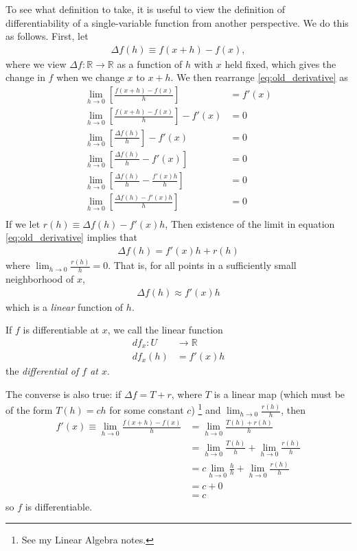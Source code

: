 \documentclass[12pt,letterpaper,reqno]{article}
\numberwithin{equation}{section}
\newcommand{\R}{\ensuremath{\mathbb R}}
\begin{document}
{To see what definition to take, it is useful to view the definition of differentiability of a single-variable function from another perspective. We do this as follows. First, let 
\begin{align*}
	\Delta f(h)\equiv f(x+h)-f(x),
\end{align*}
where we view $\Delta f:\R \to \R$ as a function of $h$ with $x$ held fixed, which gives the change in $f$ when we change $x$ to $x+h$. We then rearrange \eqref{eq:old_derivative} as 
\begin{align*}
	\lim_{h \to 0}\left[\frac{f(x+h)-f(x)}{h}\right]&=f'(x) \\
	\lim_{h \to 0}\left[\frac{f(x+h)-f(x)}{h}\right]-f'(x)&=0 \\
	\lim_{h \to 0}\left[\frac{\Delta f(h)}{h}\right]-f'(x)&=0 \\
	\lim_{h \to 0}\left[\frac{\Delta f(h)}{h}-f'(x)\right]&=0 \\
	\lim_{h \to 0}\left[\frac{\Delta f(h)}{h}-\frac{f'(x)h}{h}\right]&=0 \\
	\lim_{h \to 0}\left[\frac{\Delta f(h)-f'(x)h}{h}\right]&=0 \\
\end{align*} 
If we let $r(h) \equiv \Delta f(h)-f'(x)h$, Then existence of the limit in equation \eqref{eq:old_derivative} implies that 
\begin{align}
	\Delta f(h)=f'(x)h+r(h)
\end{align}
where $\lim_{h \to 0}\frac{r(h)}{h}=0$. That is, for all points in a sufficiently small neighborhood of $x$,
\begin{align}
	\Delta f(h) \approx f'(x)h
\end{align}
which is a \emph{linear} function of $h$. 
\begin{defn}
If $f$ is differentiable at $x$, we call the linear function 
\begin{align*}
	df_x:U &\to \R \\
	df_x(h)&=f'(x)h
\end{align*}	
the \emph{differential of $f$ at $x$}.
\end{defn}
The converse is also true: if $\Delta f=T+r$, where $T$ is a linear map (which must be of the form $T(h)=ch$ for some constant $c$) \footnote{See my Linear Algebra notes.} and $\lim_{h\to 0}\frac{r(h)}{h}$, then
\begin{align*}
	f'(x)\equiv \lim_{h \to 0}\frac{f(x+h)-f(x)}{h}&=\lim_{h \to 0}\frac{T(h)+r(h)}{h}\\
	&=\lim_{h \to 0}\frac{T(h)}{h}+\lim_{h \to 0}\frac{r(h)}{h} \\
	&=c\lim_{h \to 0}\frac{h}{h}+\lim_{h \to 0}\frac{r(h)}{h} \\
	&=c+0 \\
	&=c
\end{align*} 
so $f$ is differentiable. 

}
\end{document}
